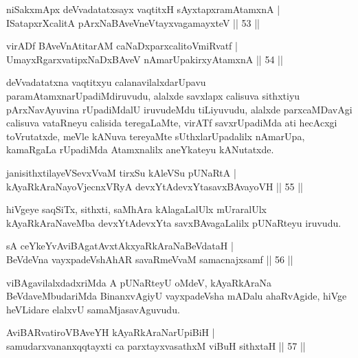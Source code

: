\begin{shl}
niSakxmApx deVvadatatxsayx vaqtitxH sAyxtapxramAtamxnA  | \\
ISatapxrXcalitA pArxNaBAveVneVtayxvagamayxteV \hfill||  53 ||  
\end{shl}

\begin{shl}
virADf BAveVnAtitarAM caNaDxparxcalitoVmiRvatf  | \\
UmayxRgarxvatipxNaDxBAveV nAmarUpakirxyAtamxnA \hfill||  54 ||  
\end{shl}

\begin{artha}
deVvadatatxna vaqtitxyu calanavilalxdarUpavu paramAtamxnarUpadiMdiruvudu, alalxde savxlapx calisuva sithxtiyu pArxNavAyuvina rUpadiMdalU iruvudeMdu tiLiyuvudu, alalxde parxcaMDavAgi calisuva vataRneyu calisida teregaLaMte, virATf savxrUpadiMda ati hecAcxgi toVrutatxde, meVle kANuva tereyaMte sUthxlarUpadalilx nAmarUpa, kamaRgaLa rUpadiMda Atamxnalilx aneYkateyu kANutatxde.
\end{artha}


\begin{shl}
janisithxtilayeVSevxVvaM tirxSu kAleVSu pUNaRtA  | \\
kAyaRkAraNayoVjecnxVRyA devxYtAdevxYtasavxBAvayoVH \hfill||  55 ||  
\end{shl}

\begin{artha}
hiVgeye saqSiTx, sithxti, saMhAra kAlagaLalUlx mUraralUlx kAyaRkAraNaveMba devxYtAdevxYta savxBAvagaLalilx pUNaRteyu iruvudu.
\end{artha}

\begin{shl}
sA ceYkeYvAviBAgatAvxtAkxyaRkAraNaBeVdataH  | \\
BeVdeVna vayxpadeVshAhAR savaRmeVvaM samacnajxsamf \hfill||  56 ||  
\end{shl}

\begin{artha}
viBAgavilalxdadxriMda A pUNaRteyU oMdeV, kAyaRkAraNa BeVdaveMbudariMda BinanxvAgiyU vayxpadeVsha mADalu ahaRvAgide, hiVge heVLidare elalxvU samaMjasavAguvudu.
\end{artha}

\begin{shl}
AviBARvatiroVBAveYH kAyaRkAraNarUpiBiH  | \\
samudarxvananxqqtayxti ca parxtayxvasathxM viBuH sithxtaH \hfill||  57 ||  
\end{shl}

